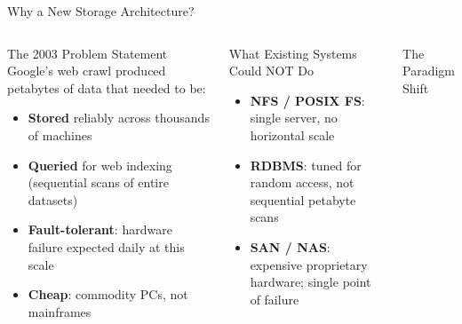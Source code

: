 \documentclass[aspectratio=169,10pt]{beamer}
\begin{document}
\begin{frame}{Why a New Storage Architecture?}
  \begin{columns}[T]
      \begin{block}{The 2003 Problem Statement}
        Google's web crawl produced petabytes of data that needed to be:
        \begin{itemize}
          \item \textbf{Stored} reliably across thousands of machines
          \item \textbf{Queried} for web indexing (sequential scans of entire datasets)
          \item \textbf{Fault-tolerant}: hardware failure expected daily at this scale
          \item \textbf{Cheap}: commodity PCs, not mainframes
        \end{itemize}
      \end{block}
      \vspace{6pt}
      \begin{alertblock}{What Existing Systems Could NOT Do}
        \begin{itemize}
          \item \textbf{NFS / POSIX FS}: single server, no horizontal scale
          \item \textbf{RDBMS}: tuned for random access, not sequential petabyte scans
          \item \textbf{SAN / NAS}: expensive proprietary hardware; single point of failure
        \end{itemize}
      \end{alertblock}

      \begin{exampleblock}{The Paradigm Shift}
        \begin{center}
\end{center}
\end{exampleblock}
\end{columns}
\end{frame}
\end{document}
